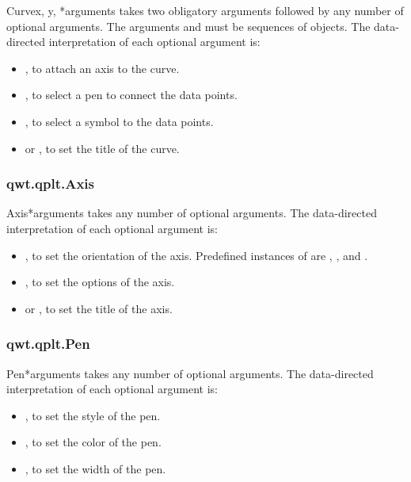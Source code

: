 \documentclass{manual}
\begin{document}
\begin{classdesc}{Curve}{x, y, *arguments}
   takes two obligatory arguments followed by any number of
  optional arguments. The arguments  and  must be sequences
  of  objects.
  The data-directed interpretation of each optional argument is:
  \begin{itemize}
  \item
    , to attach an axis to the curve.
  \item
    , to select a pen to connect the data points.
  \item
    , to select a symbol to the data points.
  \item
     or , to set the title of the curve.
  \end{itemize}
\end{classdesc}

\subsubsection{qwt.qplt.Axis \label{intro-qplt-axis}}

\begin{classdesc}{Axis}{*arguments}
   takes any number of optional arguments.
  The data-directed interpretation of each optional argument is:
  \begin{itemize}
  \item
    , to set the orientation of the axis.  Predefined
    instances of  are , ,
     and .
  \item
    , to set the options of the axis.
  \item
     or , to set the title of the axis.
  \end{itemize}
\end{classdesc}

\subsubsection{qwt.qplt.Pen \label{intro-qplt-pen}}

\begin{classdesc}{Pen}{*arguments}
   takes any number of optional arguments.
  The data-directed interpretation of each optional argument is:
  \begin{itemize}
  \item
    , to set the style of the pen.
  \item
    , to set the color of the pen.
  \item
    , to set the width of the pen.
  \end{itemize}
\end{classdesc}
\end{document}
